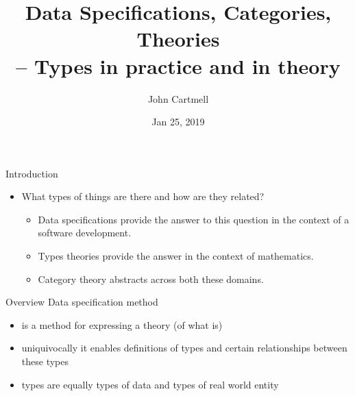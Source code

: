 \documentclass[xcolor=pst,dvips]{beamer}   %
\title[Types in practice and in theory]{Data Specifications, Categories, Theories\\ -- Types in practice and in theory}
\author{John Cartmell}
\institute{Otium}
\date{Jan 25, 2019}
\begin{document}
\begin{frame}
\titlepage
\end{frame}

\iffalse
\AtBeginSubsection[]
{
  \begin{frame}<beamer>
    \frametitle{Layout}
    \tableofcontents[currentsection,currentsubsection]
  \end{frame}
} 
\begin{frame}{Table of Contents}
\tableofcontents
\end{frame}
\fi



\begin{frame}{Introduction}
\begin{itemize}
\item
What types of things are there and how are they related? 
\begin{itemize}
\pause \item Data specifications provide the answer to this question in the context of a software development. 
\pause \item Types theories provide the answer in the context of mathematics. 
\pause \item Category theory abstracts across both these domains.
\end{itemize}
\end{itemize}

\end{frame}
\begin{frame}{Overview}
Data specification method 
\begin{itemize}
\item is a method for expressing a  theory (of what is)
\item uniquivocally it enables definitions of types and certain relationships between these types
\item types are equally types of data and types of real world entity
\end{itemize}
\end{frame}
\newcommand{\attr}[1]{#1}
\renewcommand{\attr}[1]{\psframebox[linecolor=red,framearc=.1]{#1}}
\newcommand{\attrtype}[1]{#1}
\renewcommand{\attrtype}[1]{\psframebox[linecolor=red,framearc=.1]{#1}}
\newcommand{\etype}[1]{#1}
\renewcommand{\etype}[1]{\psframebox[linecolor=red,framearc=.1]{#1}}

\end{document}
